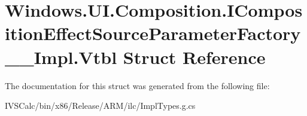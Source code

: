 \hypertarget{struct_windows_1_1_u_i_1_1_composition_1_1_i_composition_effect_source_parameter_factory_____impl_1_1_vtbl}{}\section{Windows.\+U\+I.\+Composition.\+I\+Composition\+Effect\+Source\+Parameter\+Factory\+\_\+\+\_\+\+Impl.\+Vtbl Struct Reference}
\label{struct_windows_1_1_u_i_1_1_composition_1_1_i_composition_effect_source_parameter_factory_____impl_1_1_vtbl}


The documentation for this struct was generated from the following file\+:\begin{DoxyCompactItemize}
\item 
I\+V\+S\+Calc/bin/x86/\+Release/\+A\+R\+M/ilc/Impl\+Types.\+g.\+cs\end{DoxyCompactItemize}
